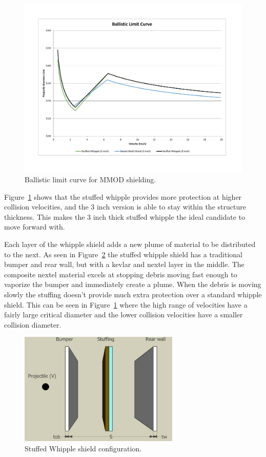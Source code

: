 \documentclass[paper=letter, fontsize=11pt]{scrartcl} %
\numberwithin{equation}{section} %
\numberwithin{figure}{section} %
\numberwithin{table}{section} %
\begin{document}
\begin{figure}[H]
    \begin{center}
        \includegraphics[width=5in]{BallisticLimit.pdf}
        \caption{Ballistic limit curve for MMOD shielding.}
        \label{fig:ballisticLimit}
    \end{center}
\end{figure}

Figure~\ref{fig:ballisticLimit} shows that the stuffed whipple provides more protection at higher collision velocities, and the 3 inch version is able to stay within the structure thickness. This makes the 3 inch thick stuffed whipple the ideal candidate to move forward with.

Each layer of the whipple shield adds a new plume of material to be distributed to the next. As seen in Figure~\ref{fig:stuffedWhipple} the stuffed whipple shield has a traditional bumper and rear wall, but with a kevlar and nextel layer in the middle. The composite nextel material excels at stopping debris moving fast enough to vaporize the bumper and immediately create a plume. When the debris is moving slowly the stuffing doesn't provide much extra protection over a standard whipple shield. This can be seen in Figure~\ref{fig:ballisticLimit} where the high range of velocities have a fairly large critical diameter and the lower collision velocities have a smaller collision diameter.

\begin{figure}[H]
    \begin{center}
        \includegraphics[width=3in]{stuffedWhipple.png}
        \caption{Stuffed Whipple shield configuration.}
        \label{fig:stuffedWhipple}
    \end{center}
\end{figure}
\end{document}
